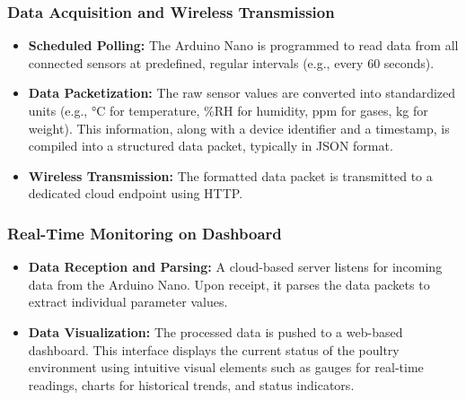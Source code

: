 \documentclass[../main.tex]{subfiles}
\begin{document}
\subsubsection{Data Acquisition and Wireless Transmission}
\begin{itemize}
    \item \textbf{Scheduled Polling:} The Arduino Nano is programmed to read data from all connected sensors at predefined, regular intervals (e.g., every 60 seconds). 
    \item \textbf{ Data Packetization:} The raw sensor values are converted into standardized units (e.g., °C for temperature, \%RH for humidity, ppm for gases, kg for weight). This information, along with a device identifier and a timestamp, is compiled into a structured data packet, typically in JSON format. 
     \item \textbf{ Wireless Transmission:} The formatted data packet is transmitted to a dedicated cloud endpoint using HTTP.
\end{itemize}
\subsubsection{Real-Time Monitoring on Dashboard}
\begin{itemize}
    \item \textbf{Data Reception and Parsing:} A cloud-based server listens for incoming data from the Arduino Nano. Upon receipt, it parses the data packets to extract individual parameter values. 
    \item \textbf{Data Visualization:} The processed data is pushed to a web-based dashboard. This interface displays the current status of the poultry environment using intuitive visual elements such as gauges for real-time readings, charts for historical trends, and status indicators. 
\end{itemize}
\end{document}
